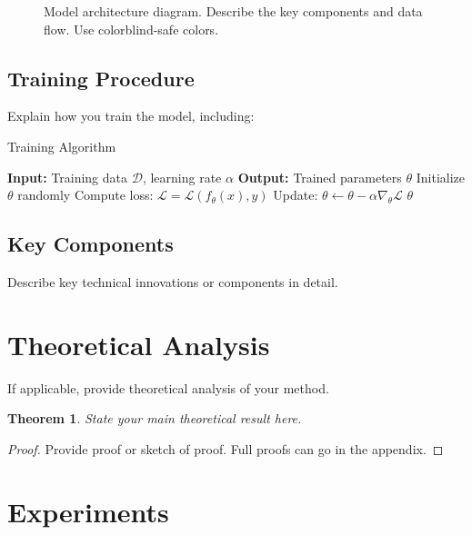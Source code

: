 \documentclass{article}
\newtheorem{theorem}{Theorem}
\begin{document}
\begin{figure}[t]
\centering
\caption{Model architecture diagram. Describe the key components and data flow. Use colorblind-safe colors.}
\label{fig:architecture}
\end{figure}

\subsection{Training Procedure}
Explain how you train the model, including:
\begin{algorithm}[t]
\caption{Training Algorithm}
\label{alg:training}
\begin{algorithmic}[1]
\STATE \textbf{Input:} Training data $\mathcal{D}$, learning rate $\alpha$
\STATE \textbf{Output:} Trained parameters $\theta$
\STATE Initialize $\theta$ randomly
        \STATE Compute loss: $\mathcal{L} = \mathcal{L}(f_\theta(x), y)$
        \STATE Update: $\theta \leftarrow \theta - \alpha \nabla_\theta \mathcal{L}$
    \ENDFOR
\ENDFOR
\RETURN $\theta$
\end{algorithmic}
\end{algorithm}

\subsection{Key Components}
Describe key technical innovations or components in detail.

\section{Theoretical Analysis}
\label{sec:theory}

If applicable, provide theoretical analysis of your method.

\begin{theorem}
\label{thm:main}
State your main theoretical result here.
\end{theorem}

\begin{proof}
Provide proof or sketch of proof. Full proofs can go in the appendix.
\end{proof}

\section{Experiments}
\label{sec:experiments}
\end{document}
